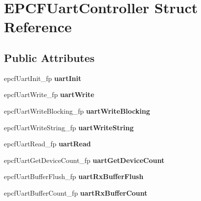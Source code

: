 \hypertarget{structEPCFUartController}{}\section{E\+P\+C\+F\+Uart\+Controller Struct Reference}
\label{structEPCFUartController}
\subsection*{Public Attributes}
\begin{DoxyCompactItemize}
\item 
\mbox{\label{structEPCFUartController_ad9e89db0604f57ed4d4721d6db0c159a}} 
epcf\+Uart\+Init\+\_\+fp {\bfseries uart\+Init}
\item 
\mbox{\label{structEPCFUartController_a68e27a52797b730fc8a1889a9be63a07}} 
epcf\+Uart\+Write\+\_\+fp {\bfseries uart\+Write}
\item 
\mbox{\label{structEPCFUartController_a02c3641ee89c534f3e678c92f147395d}} 
epcf\+Uart\+Write\+Blocking\+\_\+fp {\bfseries uart\+Write\+Blocking}
\item 
\mbox{\label{structEPCFUartController_a974c223655028d06115077c135308596}} 
epcf\+Uart\+Write\+String\+\_\+fp {\bfseries uart\+Write\+String}
\item 
\mbox{\label{structEPCFUartController_a493aed6a2064c5bc42ac98c47219dd32}} 
epcf\+Uart\+Read\+\_\+fp {\bfseries uart\+Read}
\item 
\mbox{\label{structEPCFUartController_a2b9124d73184d07b26e24d2e23b4e086}} 
epcf\+Uart\+Get\+Device\+Count\+\_\+fp {\bfseries uart\+Get\+Device\+Count}
\item 
\mbox{\label{structEPCFUartController_ace8be422807708056f967db3642f1dee}} 
epcf\+Uart\+Buffer\+Flush\+\_\+fp {\bfseries uart\+Rx\+Buffer\+Flush}
\item 
\mbox{\label{structEPCFUartController_a6daaca2b3e50ec823e500ef96d1f93af}} 
epcf\+Uart\+Buffer\+Count\+\_\+fp {\bfseries uart\+Rx\+Buffer\+Count}

\end{DoxyCompactItemize}
